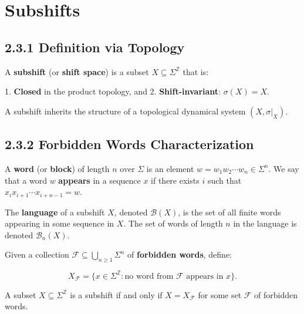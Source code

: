 \section{Subshifts}

\subsection{2.3.1 Definition via Topology}

\begin{definition}[Subshift]
A \textbf{subshift} (or \textbf{shift space}) is a subset $X \subseteq \Sigma^{\mathbb{Z}}$ that is:

1. \textbf{Closed} in the product topology, and
2. \textbf{Shift-invariant}: $\sigma(X) = X$.

A subshift inherits the structure of a topological dynamical system $(X, \sigma|_X)$.
\end{definition}

\subsection{2.3.2 Forbidden Words Characterization}

A \textbf{word} (or \textbf{block}) of length $n$ over $\Sigma$ is an element $w = w_1 w_2 \cdots w_n \in \Sigma^n$. We say that a word $w$ \textbf{appears} in a sequence $x$ if there exists $i$ such that $x_i x_{i+1} \cdots x_{i+n-1} = w$.

\begin{definition}[Language]
The \textbf{language} of a subshift $X$, denoted $\mathcal{B}(X)$, is the set of all finite words appearing in some sequence in $X$. The set of words of length $n$ in the language is denoted $\mathcal{B}_n(X)$.

Given a collection $\mathcal{F} \subseteq \bigcup_{n \geq 1} \Sigma^n$ of \textbf{forbidden words}, define:

\[X_{\mathcal{F}} = \{ x \in \Sigma^{\mathbb{Z}} : \text{no word from } \mathcal{F} \text{ appears in } x \} .\]
\end{definition}

\begin{theorem}
A subset $X \subseteq \Sigma^{\mathbb{Z}}$ is a subshift if and only if $X = X_{\mathcal{F}}$ for some set $\mathcal{F}$ of forbidden words.




\end{theorem}


